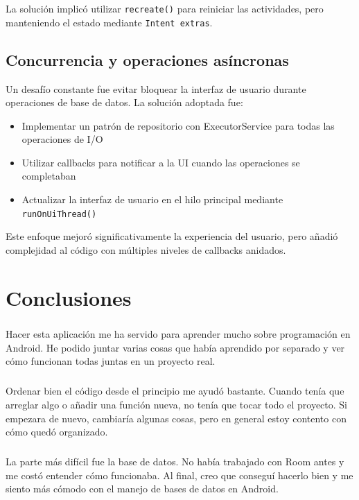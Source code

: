 \documentclass[a4paper,10pt]{report}
\begin{document}
      La solución implicó utilizar \texttt{recreate()} para reiniciar las actividades, pero manteniendo el estado mediante \texttt{Intent extras}.
      
    \section{Concurrencia y operaciones asíncronas}
      Un desafío constante fue evitar bloquear la interfaz de usuario durante operaciones de base de datos. La solución adoptada fue\cite{android_best_practices}:
      \begin{itemize}
          \item Implementar un patrón de repositorio con ExecutorService para todas las operaciones de I/O
          \item Utilizar callbacks para notificar a la UI cuando las operaciones se completaban
          \item Actualizar la interfaz de usuario en el hilo principal mediante \texttt{runOnUiThread()}
      \end{itemize}

      Este enfoque mejoró significativamente la experiencia del usuario, pero añadió complejidad al código con múltiples niveles de callbacks anidados.
  \chapter{Conclusiones}
    \paragraph*{}{Hacer esta aplicación me ha servido para aprender mucho sobre programación en Android. He podido juntar varias cosas que había aprendido por separado y ver cómo funcionan todas juntas en un proyecto real.}
    \paragraph*{}{Ordenar bien el código desde el principio me ayudó bastante. Cuando tenía que arreglar algo o añadir una función nueva, no tenía que tocar todo el proyecto. Si empezara de nuevo, cambiaría algunas cosas, pero en general estoy contento con cómo quedó organizado.}
    \paragraph*{}{La parte más difícil fue la base de datos. No había trabajado con Room antes y me costó entender cómo funcionaba. Al final, creo que conseguí hacerlo bien y me siento más cómodo con el manejo de bases de datos en Android.}
\end{document}
